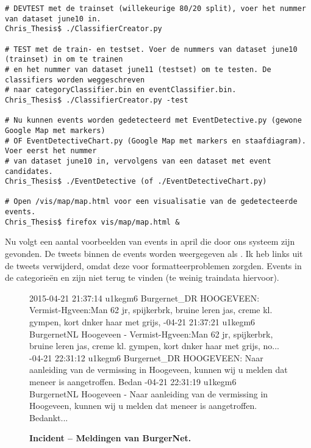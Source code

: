 {{\begin{lstlisting}
# DEVTEST met de trainset (willekeurige 80/20 split), voer het nummer van dataset june10 in.
Chris_Thesis$ ./ClassifierCreator.py

# TEST met de train- en testset. Voer de nummers van dataset june10 (trainset) in om te trainen
# en het nummer van dataset june11 (testset) om te testen. De classifiers worden weggeschreven 
# naar categoryClassifier.bin en eventClassifier.bin.
Chris_Thesis$ ./ClassifierCreator.py -test

# Nu kunnen events worden gedetecteerd met EventDetective.py (gewone Google Map met markers) 
# OF EventDetectiveChart.py (Google Map met markers en staafdiagram). Voer eerst het nummer 
# van dataset june10 in, vervolgens van een dataset met event candidates.
Chris_Thesis$ ./EventDetective (of ./EventDetectiveChart.py)

# Open /vis/map/map.html voor een visualisatie van de gedetecteerde events.
Chris_Thesis$ firefox vis/map/map.html &
\end{lstlisting}

\newpage

Nu volgt een aantal voorbeelden van events in april die door ons systeem zijn gevonden. De tweets binnen de events worden
weergegeven als . Ik heb links uit de tweets verwijderd, omdat deze voor formatteerproblemen
zorgden. Events in de categorie\"en  en  zijn niet terug te vinden (te weinig traindata hiervoor).

\begin{figure}[H]
 \caption{\bf{Incident} – Meldingen van BurgerNet.}\label{voorbeelden}
\vspace*{-10pt} 
\begin{framed}
\footnotesize{
2015-04-21 21:37:14 u1kegm6 Burgernet\_DR HOOGEVEEN: Vermist-Hgveen:Man 62 jr, spijkerbrk, bruine leren jas, creme kl. gympen, kort dnker haar met grijs,
-04-21 21:37:21 u1kegm6 BurgernetNL Hoogeveen - Vermist-Hgveen:Man 62 jr, spijkerbrk, bruine leren jas, creme kl. gympen, kort dnker haar met grijs, no...
-04-21 22:31:12 u1kegm6 Burgernet\_DR HOOGEVEEN: Naar aanleiding van de vermissing in Hoogeveen, kunnen wij u melden dat meneer is aangetroffen. Bedan
-04-21 22:31:19 u1kegm6 BurgernetNL Hoogeveen - Naar aanleiding van de vermissing in Hoogeveen, kunnen wij u melden dat meneer is aangetroffen. Bedankt...
}
\end{framed}
\end{figure}

}}
